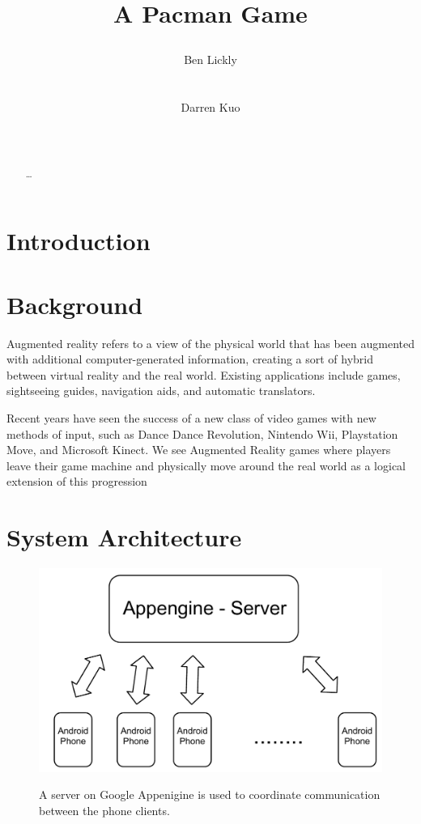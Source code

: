 \documentclass{acm_proc_article-sp}
\title{A Pacman Game
\numberofauthors{2}
\author{
\alignauthor Ben Lickly \\
       \affaddr{University of California, Berkeley}\\
       \affaddr{Berkeley, CA, USA} \\
       \email{blickly@eecs.berkeley.edu}
\alignauthor Darren Kuo \\
       \affaddr{University of California, Berkeley}\\
       \affaddr{Berkeley, CA, USA} \\
       \email{darrenkuo@eecs.berkeley.edu}
}
}
\begin{document}
\maketitle

\begin{abstract}
\ldots
\cite{ZombieRun}
\end{abstract}

\section{Introduction}
\section{Background}
Augmented reality refers to a view of the physical world that has been
augmented with additional computer-generated information, creating a
sort of hybrid between virtual reality and the real world. Existing
applications include games, sightseeing guides, navigation aids, and
automatic translators.

Recent years have seen the success of a new class of video games with
new methods of input, such as Dance Dance Revolution, Nintendo Wii,
Playstation Move, and Microsoft Kinect. We see Augmented Reality games
where players leave their game machine and physically move around the
real world as a logical extension of this progression

\section{System Architecture}

\begin{figure}
\centering
\includegraphics[scale=0.4]{figs/ServerArchitecture}
\label{fig:ServerArchitecture}
\caption{A server on Google Appenigine is used to coordinate communication between the phone clients.}
\end{figure}
\end{document}
